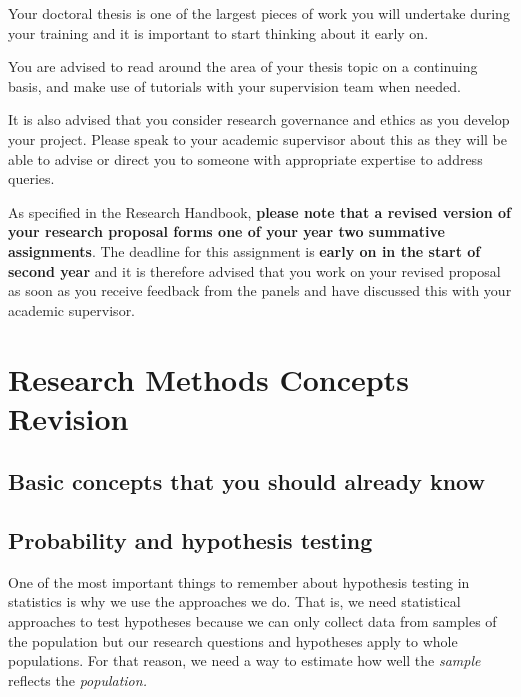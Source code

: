 \documentclass[
]{book}
\begin{document}
Your doctoral thesis is one of the largest pieces of work you will undertake during your training and it is important to start thinking about it early on.

You are advised to read around the area of your thesis topic on a continuing basis, and make use of tutorials with your supervision team when needed.

It is also advised that you consider research governance and ethics as you develop your project. Please speak to your academic supervisor about this as they will be able to advise or direct you to someone with appropriate expertise to address queries.

As specified in the Research Handbook, \textbf{please note that a revised version of your research proposal forms one of your year two summative assignments}. The deadline for this assignment is \textbf{early on in the start of second year} and it is therefore advised that you work on your revised proposal as soon as you receive feedback from the panels and have discussed this with your academic supervisor.

\hypertarget{research-methods-concepts-revision}{%
\chapter{Research Methods Concepts Revision}\label{research-methods-concepts-revision}}

\hypertarget{basic-concepts-that-you-should-already-know}{%
\section{Basic concepts that you should already know}\label{basic-concepts-that-you-should-already-know}}

\hypertarget{probability-and-hypothesis-testing}{%
\section{Probability and hypothesis testing}\label{probability-and-hypothesis-testing}}

One of the most important things to remember about hypothesis testing in statistics is why we use the approaches we do. That is, we need statistical approaches to test hypotheses because we can only collect data from samples of the population but our research questions and hypotheses apply to whole populations. For that reason, we need a way to estimate how well the \emph{sample} reflects the \emph{population.}
\end{document}
